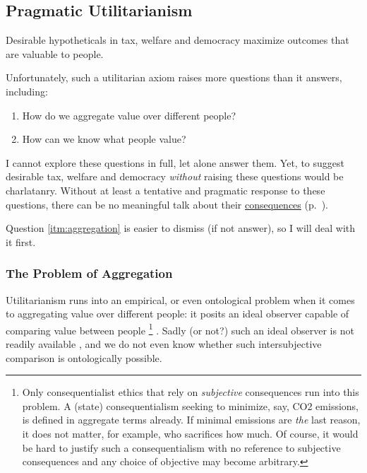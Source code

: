 \subsection[utilitarian]{Pragmatic Utilitarianism} \label{sec:utilitarian}%

Desirable hypotheticals in tax, welfare and democracy maximize outcomes that are valuable to people.

Unfortunately, such a utilitarian axiom raises more questions than
it answers, including:
\begin{enumerate}
	\item \label{itm:aggregation} How do we aggregate value over different people?
	\item \label{itm:utility} How can we know what people value?
\end{enumerate}
I cannot explore these questions in full, let alone answer them.
Yet, to suggest desirable tax, welfare and democracy \emph{without} raising these questions would be charlatanry.
Without at least a tentative and pragmatic response to these questions, there can be no meaningful talk about their \hyperref[itm:consequentialism]{consequences} (p.~\pageref{itm:consequentialism}).

Question \ref{itm:aggregation} is easier to dismiss (if not answer), so I will deal with it first.

\subsubsection[Aggregation]{The Problem of Aggregation\label{sec:aggregation}}

Utilitarianism runs into an empirical, or even ontological problem when it comes to aggregating value over different people: it posits an ideal observer capable of comparing value between people
\footnote{
	Only consequentialist ethics that rely on \emph{subjective} consequences run into this problem.
	A (state) consequentialism seeking to minimize, say, CO2 emissions, is defined in aggregate terms already.
	If minimal emissions are \emph{the} last reason, it does not matter, for example, who sacrifices how much.
	Of course, it would be hard to justify such a consequentialism with no reference to subjective consequences and any choice of objective may become arbitrary.
}
.
Sadly (or not?) such an ideal observer is not readily available \citep{Rawls1988}, and we do not even know whether such intersubjective comparison is ontologically possible.

